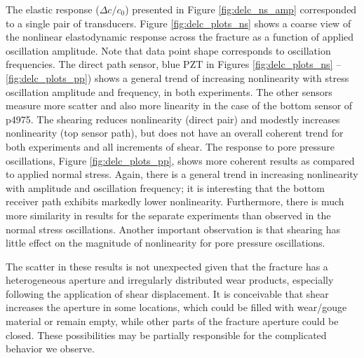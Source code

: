 \documentclass[draft]{agujournal2019}
\begin{document}
The elastic response ($ \Delta c/c_0 $) presented in Figure \ref{fig:delc_ns_amp} corresponded to a single pair of transducers. 
Figure \ref{fig:delc_plots_ns} shows a coarse view of the nonlinear elastodynamic response across the fracture as a function of applied oscillation amplitude. Note that data point shape corresponds to oscillation frequencies. The direct path sensor, blue PZT in Figures \ref{fig:delc_plots_ns} -- \ref{fig:delc_plots_pp}) shows a general trend of increasing nonlinearity with stress oscillation amplitude and frequency, in both experiments. The other sensors measure more scatter and also more linearity in the case of the bottom sensor of p4975. The shearing reduces nonlinearity (direct pair) and modestly increases nonlinearity (top sensor path), but does not have an overall coherent trend for both experiments and all increments of shear.
The response to pore pressure oscillations, Figure \ref{fig:delc_plots_pp}, shows more coherent results as compared to applied normal stress. Again, there is a general trend in increasing nonlinearity with amplitude and oscillation frequency; it is interesting that the bottom receiver path exhibits markedly lower nonlinearity. Furthermore, there is much more similarity in results for the separate experiments than observed in the normal stress oscillations. Another important observation is that shearing has little effect on the magnitude of nonlinearity for pore pressure oscillations.

The scatter in these results is not unexpected given that the fracture has a heterogeneous aperture and irregularly distributed wear products, especially following the application of shear displacement. It is conceivable that shear increases the aperture in some locations, which could be filled with wear/gouge material or remain empty, while other parts of the fracture aperture could be closed. These possibilities may be partially responsible for the complicated behavior we observe.
\end{document}
